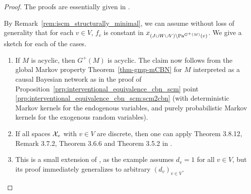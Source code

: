 \begin{proof}
The proofs are essentially given in \cite{FM17}.

By Remark~\ref{rem:iscm_structurally_minimal}, we can assume without loss of generality that for each $v \in V$, $f_v$ is constant in $x_{(J \cup W \cup V) \setminus \mathrm{Pa}^{G^+(M)}(v)}$.
We give a sketch for each of the cases.
  \begin{enumerate}
    \item
      If $M$ is acyclic, then $G^+(M)$ is acyclic.
      The claim now follows from the global Markov property Theorem~\ref{thm-gmp-mCBN} for $M$ interpreted as a causal Bayesian network as in the proof of Proposition~\ref{prp:interventional_equivalence_cbn_scm} point \ref{prp:interventional_equivalence_cbn_scm:scm2cbn} (with deterministic Markov kernels for the endogenous variables, and purely probabilistic Markov kernels for the exogenous random variables).
    \item If all spaces $\mathcal{X}_v$ with $v \in V$ are discrete, then one can apply Theorem 3.8.12, Remark 3.7.2, Theorem 3.6.6 and Theorem 3.5.2 in \cite{FM17}. 
    \item 
      This is a small extension of \cite[Example 3.8.17]{FM17}, as the example assumes $d_v=1$ for all $v\in V$, but its proof immediately generalizes to arbitrary $(d_v)_{v\in V}$.

\end{enumerate}
\end{proof}
